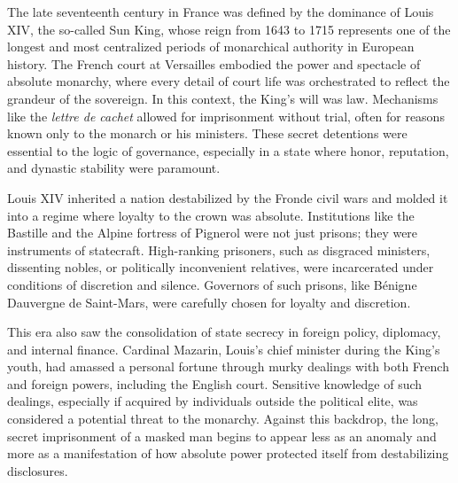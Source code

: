 \begin{historical}
The late seventeenth century in France was defined by the dominance of Louis XIV, the so-called Sun King, whose reign from 1643 to 1715 represents one of the longest and most centralized periods of monarchical authority in European history. The French court at Versailles embodied the power and spectacle of absolute monarchy, where every detail of court life was orchestrated to reflect the grandeur of the sovereign. In this context, the King's will was law. Mechanisms like the \textit{lettre de cachet} allowed for imprisonment without trial, often for reasons known only to the monarch or his ministers. These secret detentions were essential to the logic of governance, especially in a state where honor, reputation, and dynastic stability were paramount.

Louis XIV inherited a nation destabilized by the Fronde civil wars and molded it into a regime where loyalty to the crown was absolute. Institutions like the Bastille and the Alpine fortress of Pignerol were not just prisons; they were instruments of statecraft. High-ranking prisoners, such as disgraced ministers, dissenting nobles, or politically inconvenient relatives, were incarcerated under conditions of discretion and silence. Governors of such prisons, like Bénigne Dauvergne de Saint-Mars, were carefully chosen for loyalty and discretion.

This era also saw the consolidation of state secrecy in foreign policy, diplomacy, and internal finance. Cardinal Mazarin, Louis's chief minister during the King's youth, had amassed a personal fortune through murky dealings with both French and foreign powers, including the English court. Sensitive knowledge of such dealings, especially if acquired by individuals outside the political elite, was considered a potential threat to the monarchy. Against this backdrop, the long, secret imprisonment of a masked man begins to appear less as an anomaly and more as a manifestation of how absolute power protected itself from destabilizing disclosures.
\end{historical}
